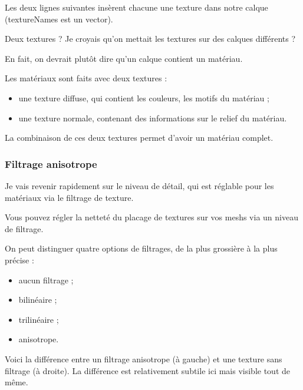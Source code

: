 \documentclass[10pt,a4paper]{report}
\begin{document}
Les deux lignes suivantes ins\`erent chacune une texture dans notre calque (textureNames est un vector).

Deux textures ? Je croyais qu'on mettait les textures sur des calques diff\'erents ?

En fait, on devrait plut\^ot dire qu'un calque contient un mat\'eriau.

Les mat\'eriaux sont faits avec deux textures :

\begin{itemize}
\item une texture diffuse, qui contient les couleurs, les motifs du mat\'eriau ;
\item une texture normale, contenant des informations sur le relief du mat\'eriau.
\end{itemize}
   

La combinaison de ces deux textures permet d'avoir un mat\'eriau complet.



\subsubsection{Filtrage anisotrope}


Je vais revenir rapidement sur le niveau de d\'etail, qui est r\'eglable pour les mat\'eriaux via le filtrage de texture.

Vous pouvez r\'egler la nettet\'e du placage de textures sur vos meshs via un niveau de filtrage.

On peut distinguer quatre options de filtrages, de la plus grossi\`ere \`a la plus pr\'ecise :

\begin{itemize}
\item aucun filtrage ;
\item bilin\'eaire ;
\item trilin\'eaire ;
\item anisotrope.
\end{itemize}


Voici la diff\'erence entre un filtrage anisotrope (\`a gauche) et une texture sans filtrage (\`a droite). La diff\'erence est relativement subtile ici mais visible tout de m\^eme.
\end{document}
